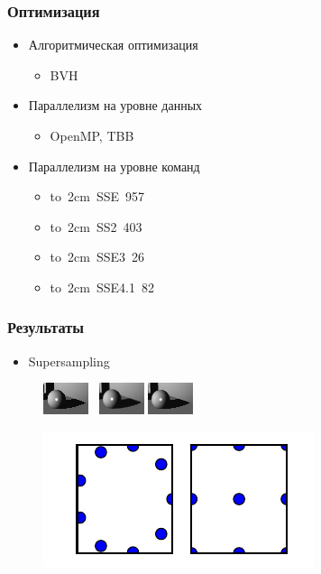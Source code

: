\documentclass[utf8, 12pt]{beamer}
\begin{document}
\begin{frame}
\frametitle{Оптимизация}
\begin{itemize}
\item Алгоритмическая оптимизация
\begin{itemize}
\item BVH 
\end{itemize}

\item Параллелизм на уровне данных
\begin{itemize}
\item OpenMP, TBB
\end{itemize}

\item Параллелизм на уровне команд
\begin{itemize}
\item \mbox{\hbox to 2cm {SSE 957}}
\item \mbox{\hbox to 2cm {SS2 403}}
\item \mbox{\hbox to 2cm {SSE3 26}}
\item \mbox{\hbox to 2cm {SSE4.1 82}}
\end{itemize}
\end{itemize}
\end{frame}

\begin{frame}
\frametitle{Результаты}
\begin{itemize}
\item Supersampling
\end{itemize}
\vspace{-2mm}
\begin{figure}[H]
\centering
\includegraphics[scale=3]{imgs/aa_no.png}  \ 
\includegraphics[scale=3]{imgs/aa_my.png}
\includegraphics[scale=3]{imgs/aa_std.png}
\end{figure}
\begin{figure}[H]
\centering
\includegraphics[scale=0.5]{imgs/aa_pattern.pdf}
\end{figure}
\end{frame}
\end{document}
